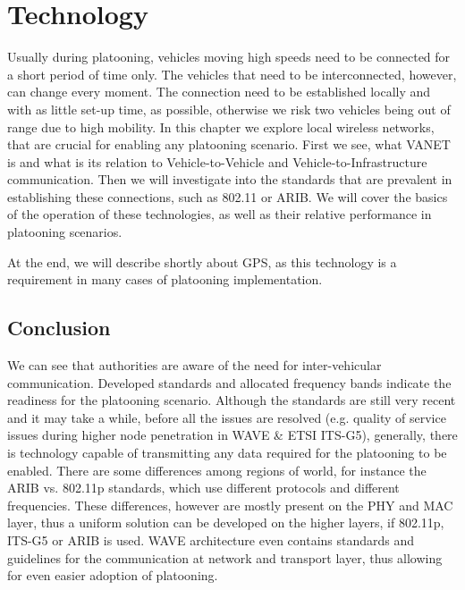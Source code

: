 \section{Technology}\label{sec:technology}

Usually during platooning, vehicles moving high speeds need to be connected for a short period of time only. The vehicles that need to be interconnected, however, can change every moment. The connection need to be established locally and with as little set-up time, as possible, otherwise we risk two vehicles being out of range due to high mobility. In this chapter we explore local wireless networks, that are crucial for enabling any platooning scenario. First we see, what VANET is and what is its relation to Vehicle-to-Vehicle and Vehicle-to-Infrastructure communication. Then we will investigate into the standards that are prevalent in establishing these connections, such as 802.11 or ARIB. We will cover the basics of the operation of these technologies, as well as their relative performance in platooning scenarios.\par
% 
At the end, we will describe shortly about GPS, as this technology is a requirement in many cases of platooning implementation.









\subsection{Conclusion}

We can see that authorities are aware of the need for inter-vehicular communication. Developed standards and allocated frequency bands indicate the readiness for the platooning scenario. Although the standards are still very recent and it may take a while, before all the issues are resolved (e.g. quality of service issues during higher node penetration in WAVE \& ETSI ITS-G5), generally, there is technology capable of transmitting any data required for the platooning to be enabled. There are some differences among regions of world, for instance the ARIB vs. 802.11p standards, which use different protocols and different frequencies. These differences, however are mostly present on the PHY and MAC layer, thus a uniform solution can be developed on the higher layers, if 802.11p, ITS-G5 or ARIB is used. WAVE architecture even contains standards and guidelines for the communication at network and transport layer, thus allowing for even easier adoption of platooning.